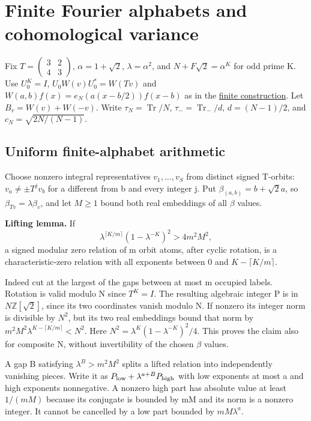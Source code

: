 \section{Finite Fourier alphabets and cohomological variance}\label{sec:finite_fourier}
Fix \(T=\left(\begin{smallmatrix}3&2\\4&3\end{smallmatrix}\right)\), \(\alpha=1+\sqrt2\), \(\lambda=\alpha^2\), and \(N+F\sqrt2=\alpha^K\) for odd prime K. Use \(U_0^K=I\), \(U_0W(v)U_0^*=W(Tv)\) and \(W(a,b)f(x)=e_N(a(x-b/2))f(x-b)\) as in the \hyperref[sec:floquet]{finite construction}. Let \(B_v=W(v)+W(-v)\). Write \(\tau_N=\operatorname{Tr}/N\), \(\tau_-=\operatorname{Tr}_-/d\), \(d=(N-1)/2\), and \(c_N=\sqrt{2N/(N-1)}\).

\subsection{Uniform finite-alphabet arithmetic}\label{finite_fourier:uniform-finite-alphabet-arithmetic}

Choose nonzero integral representatives \(v_1,\ldots,v_S\) from distinct signed T-orbits: \(v_a\ne\pm T^jv_b\) for a different from b and every integer j. Put \(\beta_{(a,b)}=b+\sqrt2 a\), so \(\beta_{Tv}=\lambda\beta_v\), and let \(M\geq1\) bound both real embeddings of all \(\beta\) values.

\textbf{Lifting lemma.} If \[
 \lambda^{\lceil K/m\rceil}(1-\lambda^{-K})^2>4m^2M^2,          \tag{FA.1}
\] a signed modular zero relation of m orbit atoms, after cyclic rotation, is a characteristic-zero relation with all exponents between 0 and \(K-\lceil K/m\rceil\).

Indeed cut at the largest of the gaps between at most m occupied labels. Rotation is valid modulo N since \(T^K=I\). The resulting algebraic integer P is in \(N\mathbb Z[\sqrt2]\), since its two coordinates vanish modulo N. If nonzero its integer norm is divisible by \(N^2\), but its two real embeddings bound that norm by \(m^2M^2\lambda^{K-\lceil K/m\rceil}<N^2\). Here \(N^2=\lambda^K(1-\lambda^{-K})^2/4\). This proves the claim also for composite N, without invertibility of the chosen \(\beta\) values.

A gap B satisfying \(\lambda^B>m^2M^2\) splits a lifted relation into independently vanishing pieces. Write it as \(P_{\rm low}+\lambda^{a+B}P_{\rm high}\) with low exponents at most a and high exponents nonnegative. A nonzero high part has absolute value at least \(1/(mM)\) because its conjugate is bounded by mM and its norm is a nonzero integer. It cannot be cancelled by a low part bounded by \(mM\lambda^a\).

